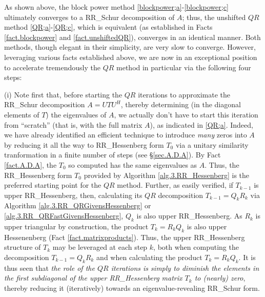 
\noindent As shown above, the block power method \eqref{blockpower;a}-\eqref{blockpower;c} ultimately converges to a RR_Schur decomposition of $A$; thus, the unshifted
$QR$ method \eqref{QR;a}-\eqref{QR;c}, which is equivalent (as established in Facts \ref{fact.blockpower} and \ref{fact.unshiftedQR}), converges in an identical manner.
Both methods, though elegant in their simplicity, are very slow to converge.
However, leveraging various facts established above, we are now in an exceptional position to accelerate tremendously the $QR$ method in particular via the following
four steps:\vskip0.1in

\noindent (i)
Note first that, before starting the $QR$ iterations to approximate the RR_Schur decomposition $A=UTU^H$, thereby determining (in the diagonal elements of $T$)
the eigenvalues of $A$, we actually don't have to start this iteration from ``scratch'' (that is, with the full matrix $A$), as indicated in
\eqref{QR;a}.  Indeed, we have already identified an efficient technique to introduce {\it many} zeros into $A$ by reducing it all the way
to RR_Hessenberg form $T_0$ via a unitary similarity tranformation in a finite number of steps (see \S \ref{sec.A.D.A}).
By Fact \ref{fact.A.D.A}, the $T_0$ so computed has the same eigenvalues as $A$.
Thus, {the RR_Hessenberg form $T_0$ provided by Algorithm \ref{alg.3.RR_Hessenberg} is the preferred starting point for the $QR$ method.}
Further, as easily verified, if $T_{k-1}$ is upper RR_Hessenberg, then, calculating its $QR$ decomposition $T_{k-1}={Q}_{k} {R}_{k}$
via Algorithm \ref{alg.3.RR_QRGivensHessenberg} or \ref{alg.3.RR_QRFastGivensHessenberg},
${Q}_{k}$ is also upper RR_Hessenberg.  As ${R}_{k}$ is upper triangular by construction, the product $T_{k} = {R}_{k} {Q}_{k}$
is also upper Hessenenberg (Fact \ref{fact.matrixproducts}).  Thus, the upper RR_Hessenberg structure of $T_{k}$ may be leveraged at each step $k$, both when computing the
decomposition $T_{k-1}={Q}_{k} {R}_{k}$ and when calculating the product $T_{k} = {R}_{k} {Q}_{k}$.  It is thus seen that
{\it the role of the $QR$ iterations is simply to diminish the elements in the first subdiagonal of the upper RR_Hessenberg matrix $T_{k}$ to (nearly) zero},
thereby reducing it (iteratively) towards an eigenvalue-revealing RR_Schur form.\vskip0.1in

